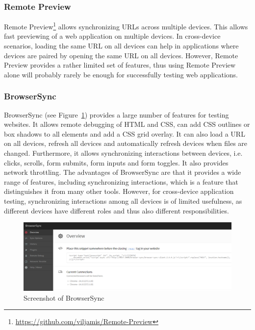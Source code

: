 \subsubsection{Remote Preview}

Remote Preview\footnote{\url{https://github.com/viljamis/Remote-Preview}} allows synchronizing URLs across multiple devices. This allows fast previewing of a web application on multiple devices. In cross-device scenarios, loading the same URL on all devices can help in applications where devices are paired by opening the same URL on all devices. However, Remote Preview provides a rather limited set of features, thus using Remote Preview alone will probably rarely be enough for successfully testing web applications.

\subsubsection{BrowserSync}

BrowserSync (see Figure~\ref{fig:browsersync}) provides a large number of features for testing websites. It allows remote debugging of HTML and CSS, can add CSS outlines or box shadows to all elements and add a CSS grid overlay. It can also load a URL on all devices, refresh all devices and automatically refresh devices when files are changed. Furthermore, it allows synchronizing interactions between devices, i.e. clicks, scrolls, form submits, form inputs and form toggles. It also provides network throttling. The advantages of BrowserSync are that it provides a wide range of features, including synchronizing interactions, which is a feature that distinguishes it from many other tools. However, for cross-device application testing, synchronizing interactions among all devices is of limited usefulness, as different devices have different roles and thus also different responsibilities.

\begin{figure}[H]
  \centering
    \includegraphics[width=1.0\textwidth]{images/relatedwork/browser_sync_3.png}
	\caption[Screenshot: BrowserSync]{Screenshot of BrowserSync}
	\label{fig:browsersync}
\end{figure}

